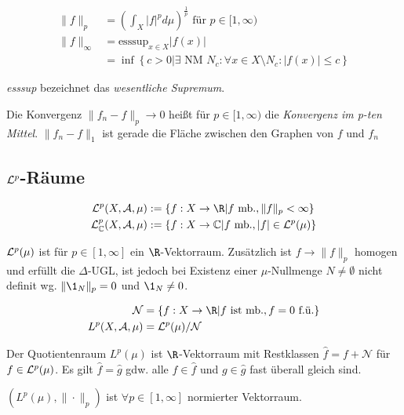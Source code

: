 \vspace{-4mm}
\begin{align*}
\|f\|_p &= \left(\int_X |f|^p d\mu\right)^\frac{1}{p} \text{ für } p \in [1,\infty)\\
\|f\|_\infty &= \text{esssup}_{x \in X} |f(x)|\\
      &= \inf\left\{ c > 0 | \exists \text{ NM } N_c : \forall x \in X \setminus N_c : |f(x)| \leq c\right\}
\end{align*}

\emph{esssup} bezeichnet das \emph{wesentliche Supremum}.

\spacing

Die Konvergenz $\| f_n - f \|_p \to 0$ heißt für $p \in [1,\infty)$ die \emph{Konvergenz im p-ten Mittel}. $\| f_n - f \|_1$ ist gerade die Fläche zwischen den Graphen von $f$ und $f_n$

\subsection*{$\mathcal{L}^p$-Räume}

\vspace{-4mm}
\begin{align*}
\L^p(X,\A,\mu) &:= \{ f : X \to \R | f \text{ mb.}, \|f\|_p < \infty\} \\
\L_\mathbb{C}^p(X,\A,\mu) &:= \{ f : X \to \mathbb{C} | f \text{ mb.}, |f| \in \L^p(\mu) \}
\end{align*}

$\mathcal{L}^p(\mu)$ ist für $p \in [1,\infty]$ ein $\R$-Vektorraum. Zusätzlich ist $f \to \|f\|_p$ homogen und erfüllt die $\Delta$-UGL, ist jedoch bei Existenz einer $\mu$-Nullmenge $N \neq \emptyset$ nicht definit wg. $\|\1_N\|_p = 0$ und $\1_N \neq 0$.

\vspace{-4mm}
\begin{align*}
\mathcal{N} &= \{ f : X \to \R | f \text{ ist mb.}, f = 0 \text{ f.ü.}\} \\
L^p(X,\A,\mu) &= \L^p(\mu) / \mathcal{N}
\end{align*}

Der Quotientenraum $L^p(\mu)$ ist $\R$-Vektorraum mit Restklassen $\hat f = f + \mathcal{N}$ für $f \in \mathcal{L}^p(\mu)$. Es gilt $\hat f = \hat g$ gdw. alle $f \in \hat f$ und $g \in \hat g$ fast überall gleich sind.

\spacing

$(L^p(\mu),\|\cdot\|_p)$ ist $\forall p \in [1,\infty]$ normierter Vektorraum.

